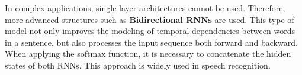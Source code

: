 In complex applications, single-layer architectures cannot be used. Therefore, more advanced structures such as \textbf{Bidirectional RNNs} are used. This type of model not only improves the modeling of temporal dependencies between words in a sentence, but also processes the input sequence both forward and backward. When applying the softmax function, it is necessary to concatenate the hidden states of both RNNs. This approach is widely used in speech recognition.